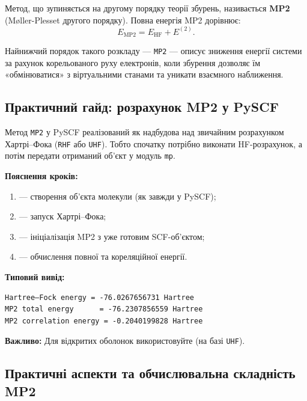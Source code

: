 Метод, що зупиняється на другому порядку теорії збурень, називається \textbf{MP2} (Møller-Plesset другого порядку).
Повна енергія MP2 дорівнює:
\begin{equation}
    E_{\mathrm{MP2}} = E_{\mathrm{HF}} + E^{(2)}.
\end{equation}

Найнижчий порядок такого розкладу --- \texttt{MP2} --- описує зниження енергії системи
за рахунок корельованого руху електронів, коли збурення дозволяє їм
«обмінюватися» з віртуальними станами та уникати взаємного наближення.



\subsection{Практичний гайд: розрахунок MP2 у PySCF}

Метод \texttt{MP2} у PySCF реалізований як надбудова над
звичайним розрахунком Хартрі–Фока (\texttt{RHF} або \texttt{UHF}).
Тобто спочатку потрібно виконати HF-розрахунок, а потім
передати отриманий об’єкт у модуль \texttt{mp}.


\textbf{Пояснення кроків:}
\begin{enumerate}
	\item {} --- створення об'єкта молекули (як завжди у PySCF);
	\item {} --- запуск Хартрі–Фока;
	\item {} --- ініціалізація MP2 з уже готовим SCF-об’єктом;
	\item {} --- обчислення повної та кореляційної енергії.
\end{enumerate}

\textbf{Типовий вивід:}
\begin{verbatim}
Hartree–Fock energy = -76.0267656731 Hartree
MP2 total energy      = -76.2307856559 Hartree
MP2 correlation energy = -0.2040199828 Hartree
\end{verbatim}

\textbf{Важливо:} Для відкритих оболонок використовуйте  (на базі \texttt{UHF}).

\subsection{Практичні аспекти та обчислювальна складність MP2}

